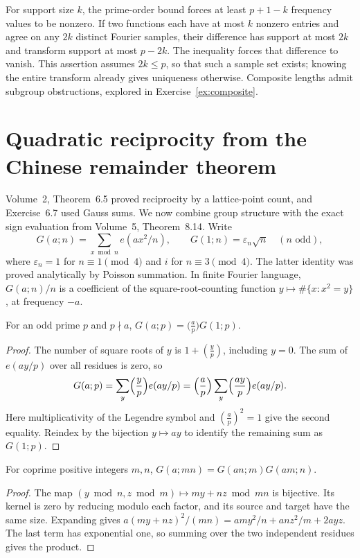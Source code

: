 For support size $k$, the prime-order bound forces at least $p+1-k$ frequency values to be nonzero. If two functions each have at most $k$ nonzero entries and agree on any $2k$ distinct Fourier samples, their difference has support at most $2k$ and transform support at most $p-2k$. The inequality forces that difference to vanish. This assertion assumes $2k\le p$, so that such a sample set exists; knowing the entire transform already gives uniqueness otherwise. Composite lengths admit subgroup obstructions, explored in Exercise~\ref{ex:composite}.

\section{Quadratic reciprocity from the Chinese remainder theorem}

Volume~2, Theorem~6.5 proved reciprocity by a lattice-point count, and Exercise~6.7 used Gauss sums. We now combine group structure with the exact sign evaluation from Volume~5, Theorem~8.14. Write
\[
G(a;n)=\sum_{x\bmod n}e(ax^2/n),\qquad
G(1;n)=\varepsilon_n\sqrt n\quad(n\text{ odd}),
\]
where $\varepsilon_n=1$ for $n\equiv1\pmod4$ and $i$ for $n\equiv3\pmod4$. The latter identity was proved analytically by Poisson summation. In finite Fourier language, $G(a;n)/n$ is a coefficient of the square-root-counting function $y\mapsto\#\{x:x^2=y\}$, at frequency $-a$.

\begin{lemma}\label{lem:gaussa}
For an odd prime $p$ and $p\nmid a$, $G(a;p)=\bigl(\frac ap\bigr)G(1;p)$.
\end{lemma}
\begin{proof}
The number of square roots of $y$ is $1+(\frac yp)$, including $y=0$. The sum of $e(ay/p)$ over all residues is zero, so
\[
G(a;p)=\sum_y\Bigl(\frac yp\Bigr)e(ay/p)
=\Bigl(\frac ap\Bigr)\sum_y\Bigl(\frac{ay}p\Bigr)e(ay/p).
\]
Here multiplicativity of the Legendre symbol and $(\frac ap)^2=1$ give the second equality. Reindex by the bijection $y\mapsto ay$ to identify the remaining sum as $G(1;p)$.
\end{proof}

\begin{lemma}\label{lem:gaussmult}
For coprime positive integers $m,n$, $G(a;mn)=G(an;m)G(am;n)$.
\end{lemma}
\begin{proof}
The map $(y\bmod n,z\bmod m)\mapsto my+nz\bmod mn$ is bijective. Its kernel is zero by reducing modulo each factor, and its source and target have the same size. Expanding gives
$ a(my+nz)^2/(mn)=amy^2/n+anz^2/m+2ayz$.
The last term has exponential one, so summing over the two independent residues gives the product.
\end{proof}

